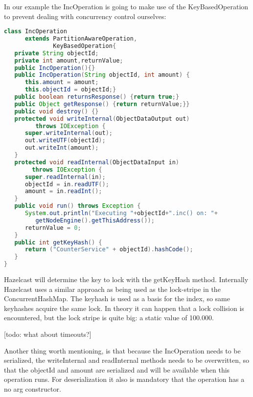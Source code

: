 In our example the IncOperation is going to make use of the KeyBasedOperation to prevent dealing with concurrency control ourselves:
\begin{lstlisting}[language=java]
class IncOperation 
      extends PartitionAwareOperation, 
              KeyBasedOperation{
   private String objectId;
   private int amount,returnValue;
   public IncOperation(){}
   public IncOperation(String objectId, int amount) {
      this.amount = amount;
      this.objectId = objectId;}
   public boolean returnsResponse() {return true;}
   public Object getResponse() {return returnValue;}}
   public void destroy() {}
   protected void writeInternal(ObjectDataOutput out) 
         throws IOException {
      super.writeInternal(out);
      out.writeUTF(objectId);
      out.writeInt(amount);
   }
   protected void readInternal(ObjectDataInput in) 
        throws IOException {
      super.readInternal(in);
      objectId = in.readUTF();
      amount = in.readInt();
   }
   public void run() throws Exception {
      System.out.println("Executing "+objectId+".inc() on: "+
         getNodeEngine().getThisAddress());            
      returnValue = 0;
   }
   public int getKeyHash() {
      return ("CounterService" + objectId).hashCode();
   }
}	
\end{lstlisting}
Hazelcast will determine the key to lock with the getKeyHash method. Internally Hazelcast uses a similar approach as being used as the lock-stripe in the ConcurrentHashMap. The keyhash is used as a basis for the index, so same keyhashes acquire the same lock. In theory it can happen that a lock collision is encountered, but the lock stripe is quite big: a static value of 100.000.

[todo: what about timeouts?]

Another thing worth mentioning, is that because the IncOperation needs to be serialized, the writeInternal and readInternal methods needs to be overwritten, so that the objectId and amount are serialized and will be available when this operation runs. For deserialization it also is mandatory that the operation has a no arg constructor.

